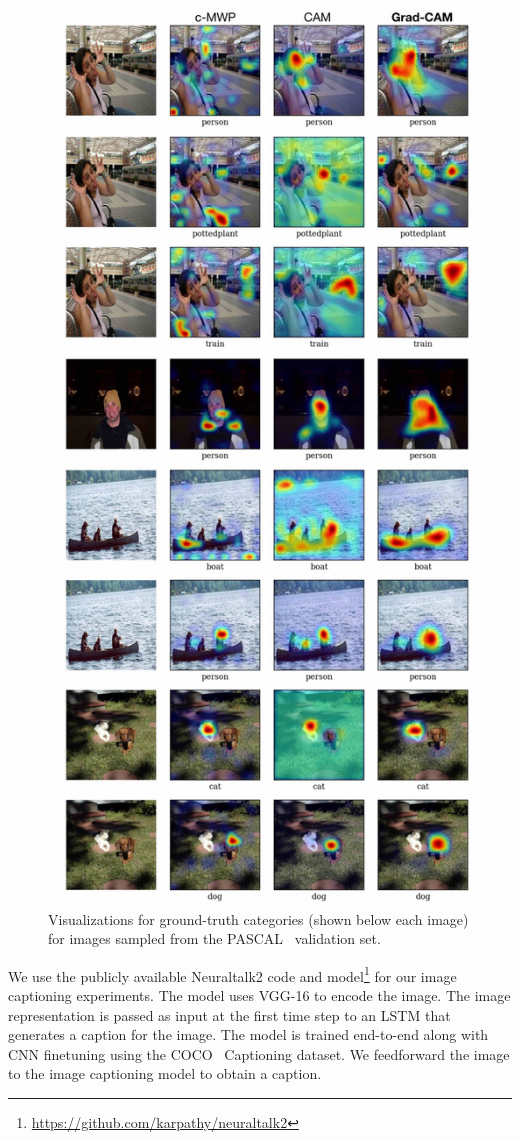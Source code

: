 \begin{figure}[htp]
 \centering
 \includegraphics[width=0.65\linewidth]{figures/gcam_pascal.jpg}
 \caption{Visualizations for ground-truth categories (shown below each image) for images sampled from the PASCAL~\cite{pascal-voc-2007} validation set.}
 \label{fig:gcam_pascal}
\end{figure}


We use the publicly available Neuraltalk2 code and model\footnote{\url{https://github.com/karpathy/neuraltalk2}} for our image captioning experiments.
The model uses VGG-16 to encode the image.
The image representation is passed as input at the first time step to an LSTM that generates a caption for the image.
The model is trained end-to-end along with CNN finetuning using the COCO~\cite{Lin_2014} Captioning dataset.
We feedforward the image to the image captioning model to obtain a caption.  %


